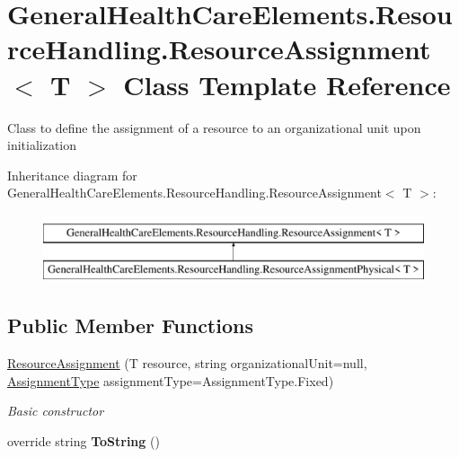 \hypertarget{class_general_health_care_elements_1_1_resource_handling_1_1_resource_assignment}{}\section{General\+Health\+Care\+Elements.\+Resource\+Handling.\+Resource\+Assignment$<$ T $>$ Class Template Reference}
\label{class_general_health_care_elements_1_1_resource_handling_1_1_resource_assignment}


Class to define the assignment of a resource to an organizational unit upon initialization  


Inheritance diagram for General\+Health\+Care\+Elements.\+Resource\+Handling.\+Resource\+Assignment$<$ T $>$\+:\begin{figure}[H]
\begin{center}
\leavevmode
\includegraphics[height=2.000000cm]{class_general_health_care_elements_1_1_resource_handling_1_1_resource_assignment}
\end{center}
\end{figure}
\subsection*{Public Member Functions}
\begin{DoxyCompactItemize}
\item 
\hyperlink{class_general_health_care_elements_1_1_resource_handling_1_1_resource_assignment_a0fd997a57e7900a69b1c5590e17090c7}{Resource\+Assignment} (T resource, string organizational\+Unit=null, \hyperlink{namespace_enums_ac8e46c12834f4cb6a641854bd0676221}{Assignment\+Type} assignment\+Type=Assignment\+Type.\+Fixed)
\begin{DoxyCompactList}\small\item\em Basic constructor \end{DoxyCompactList}\item 
override string {\bfseries To\+String} ()\hypertarget{class_general_health_care_elements_1_1_resource_handling_1_1_resource_assignment_a15fb07657ba8b628e1da8d43974e8b19}{}\label{class_general_health_care_elements_1_1_resource_handling_1_1_resource_assignment_a15fb07657ba8b628e1da8d43974e8b19}

\end{DoxyCompactItemize}
